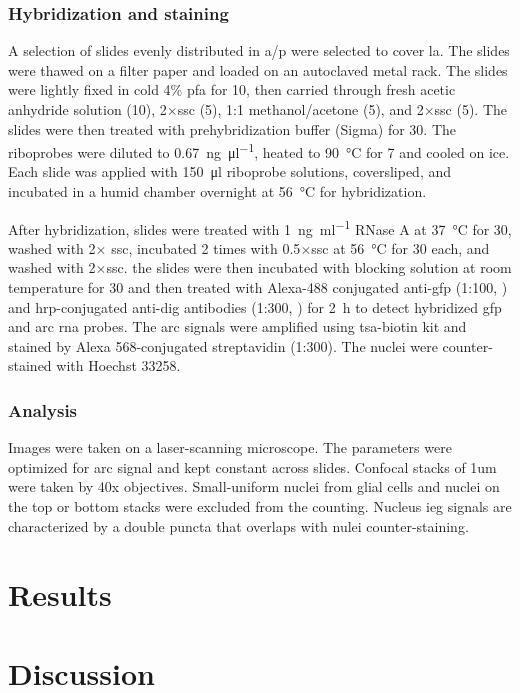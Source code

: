 \subsubsection{Hybridization and staining}
A selection of slides evenly distributed in \gls{a/p} were selected to cover \gls{la}. The slides were thawed on a filter paper and loaded on an autoclaved metal rack. The slides were lightly fixed in cold 4\% \gls{pfa} for \SI{10}{\min}, then carried through fresh acetic anhydride solution (\SI{10}{\min}), 2$\times$\gls{ssc} (\SI{5}{\min}), 1:1 methanol\slash acetone (\SI{5}{\min}), and 2$\times$\gls{ssc} (\SI{5}{\min}). The slides were then treated with prehybridization buffer (Sigma) for \SI{30}{\min}. The riboprobes were diluted to \SI{0.67}{\ng\per\ul}, heated to \SI{90}{\celsius} for \SI{7}{\min} and cooled on ice. Each slide was applied with \SI{150}{\ul} riboprobe solutions, coversliped, and incubated in a humid chamber overnight at \SI{56}{\celsius} for hybridization.

After hybridization, slides were treated with \SI{1}{\ng\per\ml} RNase A at \SI{37}{\celsius} for \SI{30}{\min}, washed with 2$\times$ \gls{ssc}, incubated 2 times with 0.5$\times$\gls{ssc} at \SI{56}{\celsius} for \SI{30}{\min} each, and washed with 2$\times$\gls{ssc}. the slides were then incubated with blocking solution at room temperature for \SI{30}{\min} and then treated with Alexa-488 conjugated anti-\gls{gfp} (1:100, ) and \gls{hrp}-conjugated anti-\gls{dig} antibodies (1:300, ) for \SI{2}{\hour} to detect hybridized \gls{gfp} and \gls{arc} \gls{rna} probes. The \gls{arc} signals were amplified using \gls{tsa}-biotin kit and stained by Alexa 568-conjugated streptavidin (1:300). The nuclei were counter-stained with Hoechst 33258.

\subsubsection{Analysis}
Images were taken on a laser-scanning microscope. The parameters were optimized for \gls{arc} signal and kept constant across slides. Confocal stacks of 1um were taken by 40x objectives. Small-uniform nuclei from glial cells and nuclei on the top or bottom stacks were excluded from the counting. Nucleus \gls{ieg} signals are characterized by a double puncta that overlaps with nulei counter-staining. %

\section{Results}
\section{Discussion}
